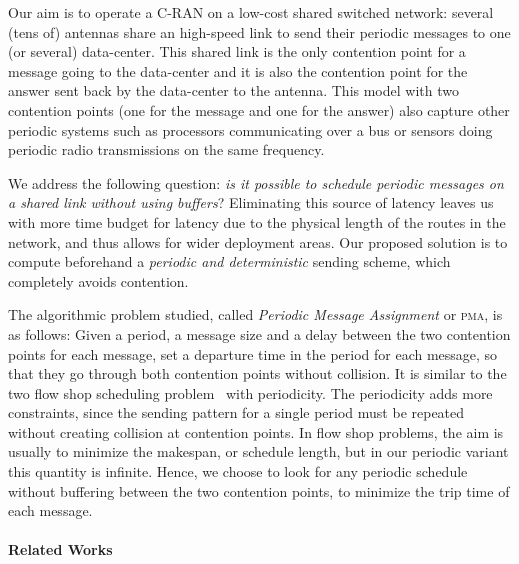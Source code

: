 \documentclass[a4paper,UKenglish,cleveref, autoref, thm-restate]{lipics-v2019}
\newcommand\pma{\textsc{pma}\xspace}
\begin{document}
Our aim is to operate a C-RAN on a low-cost shared switched network: several (tens of) antennas share an high-speed link to send their periodic messages to one (or several) data-center. This shared link is the only contention point for a message going to the data-center and it is also the contention point for the answer sent back by the data-center to the antenna.
This model with two contention points (one for the message and one for the answer) also capture other periodic systems such as processors communicating over a bus or sensors doing periodic radio transmissions on the same frequency.

We address the following question: \emph{is it possible to schedule periodic messages on a shared link without using buffers}? Eliminating this source of latency leaves us with more time budget for latency due to the physical length of the routes in the network, and thus allows for wider deployment areas. Our proposed solution is to compute beforehand a \emph{periodic and deterministic} sending scheme, which completely avoids contention.  

The algorithmic problem studied, called \emph{Periodic Message Assignment} or \pma, is as follows:
Given a period, a message size and a delay between the two contention points for each message, set a departure time in the period for each message, so that they go through both contention points without collision. It is similar to the two flow shop scheduling problem~\cite{yu2004minimizing} with periodicity. The periodicity adds more constraints, since the sending pattern for a single period must be repeated without creating collision at contention points. In flow shop problems, the aim is usually to minimize the makespan, or schedule length, but in our periodic variant this quantity is infinite. Hence, we choose to look for any periodic schedule without buffering between the two contention points, to minimize the trip time of each message. 


\paragraph*{Related Works}
\end{document}
